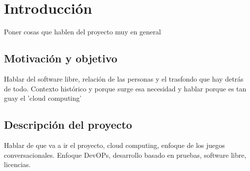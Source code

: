 \chapter{Introducción}
Poner cosas que hablen del proyecto muy en general
\section{Motivación y objetivo}
Hablar del software libre, relación de las personas y el trasfondo que hay detrás de todo. Contexto histórico y porque surge esa necesidad y hablar porque es tan guay el 'cloud computing'
\section{Descripción del proyecto}
Hablar de que va a ir el proyecto, cloud computing, enfoque de los juegos conversacionales. Enfoque DevOPs, desarrollo basado en pruebas, software libre, licencias.